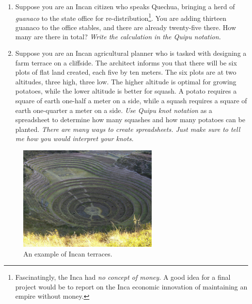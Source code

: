 \documentclass[10pt]{article}
\begin{document}
\begin{enumerate}
\item Suppose you are an Incan citizen who speaks Quechua, bringing a herd of \textit{guanaco} to the state office for re-distribution\footnote{Fascinatingly, the Inca had \textit{no concept of money.} A good idea for a final project would be to report on the Inca economic innovation of maintaining an empire without money.}.  You are adding thirteen guanaco to the office stables, and there are already twenty-five there.  How many are there in total?  \textit{Write the calculation in the Quipu notation.} \\ \vspace{3cm}
\item Suppose you are an Incan agricultural planner who is tasked with designing a farm terrace on a cliffside.  The architect informs you that there will be six plots of flat land created, each five by ten meters.  The six plots are at two altitudes, three high, three low.  The higher altitude is optimal for growing potatoes, while the lower altitude is better for squash.  A potato requires a square of earth one-half a meter on a side, while a squash requires a square of earth one-quarter a meter on a side.  \textit{Use Quipu knot notation} as a spreadsheet to determine how many squashes and how many potatoes can be planted.  \textit{There are many ways to create spreadsheets.  Just make sure to tell me how you would interpret your knots.}
\end{enumerate}

\begin{figure}
\centering
\includegraphics[width=7cm]{figures/terrace.jpeg}
\caption{An example of Incan terraces.}
\end{figure}
\end{document}
